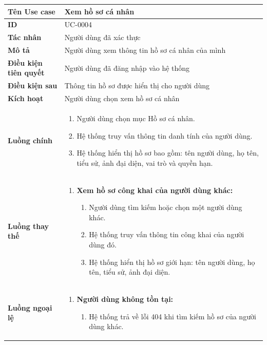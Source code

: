 {
\small
\renewcommand{\arraystretch}{1.15}

\begin{tabularx}{\textwidth}{|>{\raggedright\arraybackslash}p{3.5cm}|>{\raggedright\arraybackslash}X|}
\hline
\textbf{Tên Use case} & Xem hồ sơ cá nhân \\
\hline
\textbf{ID} & UC-0004 \\
\hline
\textbf{Tác nhân} & Người dùng đã xác thực \\
\hline
\textbf{Mô tả} & Người dùng xem thông tin hồ sơ cá nhân của mình \\
\hline
\textbf{Điều kiện tiên quyết} & Người dùng đã đăng nhập vào hệ thống \\
\hline
\textbf{Điều kiện sau} & Thông tin hồ sơ được hiển thị cho người dùng \\
\hline
\textbf{Kích hoạt} & Người dùng chọn xem hồ sơ cá nhân \\
\hline
\textbf{Luồng chính} &
\begin{enumerate}
    \item Người dùng chọn mục Hồ sơ cá nhân.
    \item Hệ thống truy vấn thông tin danh tính của người dùng.
    \item Hệ thống hiển thị hồ sơ bao gồm: tên người dùng, họ tên, tiểu sử, ảnh đại diện, vai trò và quyền hạn.
\end{enumerate} \\
\hline
\textbf{Luồng thay thế} &
\begin{enumerate}
    \item \textbf{Xem hồ sơ công khai của người dùng khác:}
    \begin{enumerate}
        \item[1A.] Người dùng tìm kiếm hoặc chọn một người dùng khác.
        \item[2A.] Hệ thống truy vấn thông tin công khai của người dùng đó.
        \item[3A.] Hệ thống hiển thị hồ sơ giới hạn: tên người dùng, họ tên, tiểu sử, ảnh đại diện.
    \end{enumerate}
\end{enumerate} \\
\hline
\textbf{Luồng ngoại lệ} &
\begin{enumerate}
    \item \textbf{Người dùng không tồn tại:}
    \begin{enumerate}
        \item[2AErr.] Hệ thống trả về lỗi 404 khi tìm kiếm hồ sơ của người dùng khác.
    \end{enumerate}
\end{enumerate} \\
\hline
\end{tabularx}
}
